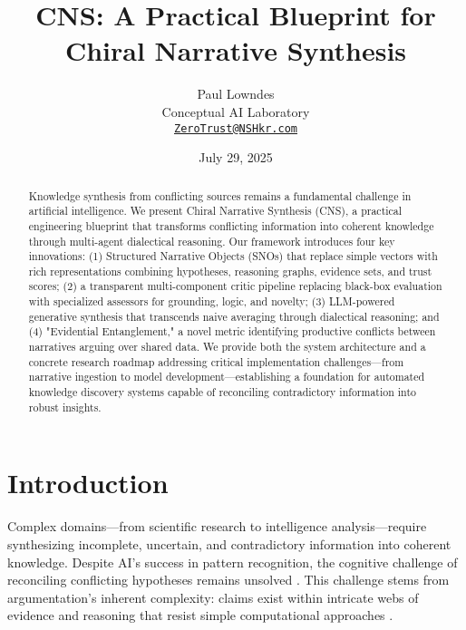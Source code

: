 \documentclass[12pt, a4paper]{article}
\title{\textbf{CNS: A Practical Blueprint for Chiral Narrative Synthesis}}
\author{
    Paul Lowndes \\
    \small Conceptual AI Laboratory \\
    \small \href{mailto:ZeroTrust@NSHkr.com}{\texttt{ZeroTrust@NSHkr.com}}
}
\date{July 29, 2025}
\begin{document}
\maketitle
\vspace{-2em}

\begin{abstract}
Knowledge synthesis from conflicting sources remains a fundamental challenge in artificial intelligence. We present Chiral Narrative Synthesis (CNS), a practical engineering blueprint that transforms conflicting information into coherent knowledge through multi-agent dialectical reasoning. Our framework introduces four key innovations: (1) Structured Narrative Objects (SNOs) that replace simple vectors with rich representations combining hypotheses, reasoning graphs, evidence sets, and trust scores; (2) a transparent multi-component critic pipeline replacing black-box evaluation with specialized assessors for grounding, logic, and novelty; (3) LLM-powered generative synthesis that transcends naive averaging through dialectical reasoning; and (4) "Evidential Entanglement," a novel metric identifying productive conflicts between narratives arguing over shared data. We provide both the system architecture and a concrete research roadmap addressing critical implementation challenges—from narrative ingestion to model development—establishing a foundation for automated knowledge discovery systems capable of reconciling contradictory information into robust insights.
\end{abstract}

\section{Introduction}
Complex domains—from scientific research to intelligence analysis—require synthesizing incomplete, uncertain, and contradictory information into coherent knowledge. Despite AI's success in pattern recognition, the cognitive challenge of reconciling conflicting hypotheses remains unsolved \citep{Boström2017}. This challenge stems from argumentation's inherent complexity: claims exist within intricate webs of evidence and reasoning that resist simple computational approaches \citep{Toulmin2003}. 
\end{document}
